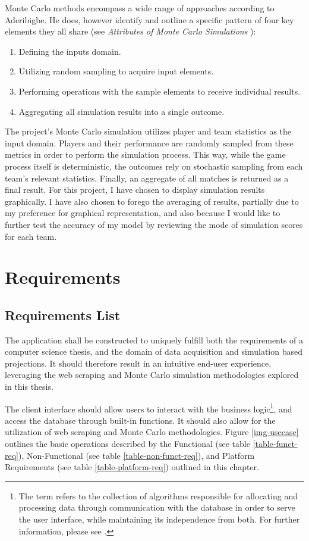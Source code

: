 \documentclass{thesis-ekf}
\theoremstyle{definition}
\theoremstyle{remark}
\begin{document}
Monte Carlo methods encompass a wide range of approaches according to Aderibigbe. He does, however identify and outline a specific pattern of four key elements they all share (see \emph{Attributes of Monte Carlo Simulations} \cite[p.~2]{Aderibigbe}):
\begin{enumerate}
	\item Defining the inputs domain.
	\item Utilizing random sampling to acquire input elements.
	\item Performing operations with the sample elements to receive individual results.
	\item Aggregating all simulation results into a single outcome.
\end{enumerate}
The project's Monte Carlo simulation utilizes player and team statistics as the input domain. Players and their performance are randomly sampled from these metrics in order to perform the simulation process. This way, while the game process itself is deterministic, the outcomes rely on stochastic sampling from each team's relevant statistics. Finally, an aggregate of all matches is returned as a final result. For this project, I have chosen to display simulation results graphically. I have also chosen to forego the averaging of results, partially due to my preference for graphical representation, and also because I would like to further test the accuracy of my model by reviewing the mode of simulation scores for each team.


\chapter{Requirements}

\section{Requirements List}
The application shall be constructed to uniquely fulfill both the requirements of a computer science thesis, and the domain of data acquisition and simulation based projections. It should therefore result in an intuitive end-user experience, leveraging the web scraping and Monte Carlo simulation methodologies explored in this thesis.

The client interface should allow users to interact with the business logic\footnote{The term refers to the collection of algorithms responsible for allocating and processing data through communication with the database in order to serve the user interface, while maintaining its independence from both. For further information, please see \cite{Booch}.}, and access the database through built-in functions. It should also allow for the utilization of web scraping and Monte Carlo methodologies. Figure \ref{img-usecase} outlines the basic operations described by the Functional (see table {\ref{table-funct-req}}), Non-Functional (see table {\ref{table-non-funct-req}}), and Platform Requirements (see table {\ref{table-platform-req}}) outlined in this chapter.
\end{document}
